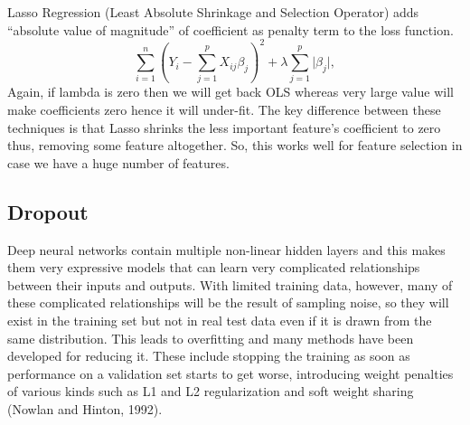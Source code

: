 Lasso Regression (Least Absolute Shrinkage and Selection Operator) adds
``absolute value of magnitude'' of coefficient as penalty term to the loss function.
\begin{equation}
	\label{equ:lasso_regresson}
	\sum_{i=1}^{n}(Y_{i}-\sum_{j=1}^{p}X_{ij}\beta_{j})^{2} + \lambda \sum_{j=1}^{p}
	\vert \beta_{j} \vert,
\end{equation}
Again, if lambda is zero then we will get back OLS whereas very large value will make coefficients 
zero hence it will under-fit.
The key difference between these techniques is that Lasso shrinks the less important feature’s 
coefficient to zero thus, removing some feature altogether. 
So, this works well for feature selection in case we have a huge number of features.

\subsection{Dropout}
Deep neural networks contain multiple non-linear hidden layers and this makes them very
expressive models that can learn very complicated relationships between their inputs and
outputs. With limited training data, however, many of these complicated relationships
will be the result of sampling noise, so they will exist in the training set but not in real
test data even if it is drawn from the same distribution. This leads to overfitting and many
methods have been developed for reducing it. These include stopping the training as soon as
performance on a validation set starts to get worse, introducing weight penalties of various
kinds such as L1 and L2 regularization and soft weight sharing (Nowlan and Hinton, 1992).

